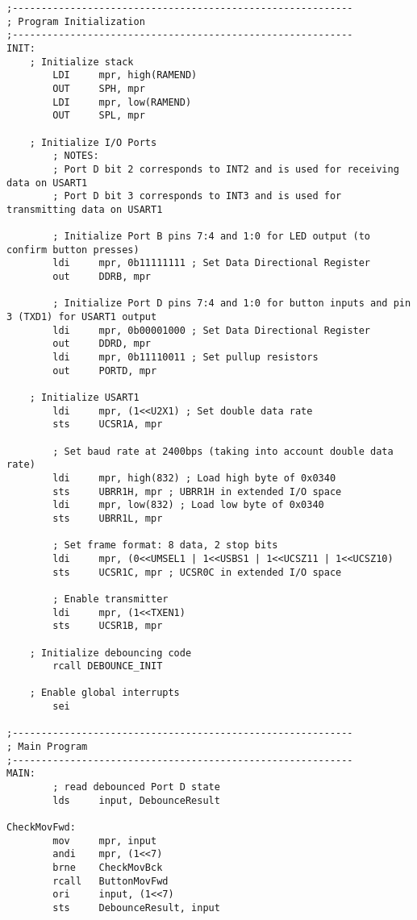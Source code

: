 \documentclass[12pt,letterpaper]{article}
\begin{document}
\begin{verbatim}
;-----------------------------------------------------------
; Program Initialization
;-----------------------------------------------------------
INIT:
    ; Initialize stack
        LDI     mpr, high(RAMEND)
        OUT     SPH, mpr
        LDI     mpr, low(RAMEND)
        OUT     SPL, mpr

    ; Initialize I/O Ports
        ; NOTES:
        ; Port D bit 2 corresponds to INT2 and is used for receiving data on USART1
        ; Port D bit 3 corresponds to INT3 and is used for transmitting data on USART1

        ; Initialize Port B pins 7:4 and 1:0 for LED output (to confirm button presses)
        ldi     mpr, 0b11111111 ; Set Data Directional Register
        out     DDRB, mpr

        ; Initialize Port D pins 7:4 and 1:0 for button inputs and pin 3 (TXD1) for USART1 output
        ldi     mpr, 0b00001000 ; Set Data Directional Register
        out     DDRD, mpr
        ldi     mpr, 0b11110011 ; Set pullup resistors
        out     PORTD, mpr

    ; Initialize USART1
        ldi     mpr, (1<<U2X1) ; Set double data rate
        sts     UCSR1A, mpr

        ; Set baud rate at 2400bps (taking into account double data rate)
        ldi     mpr, high(832) ; Load high byte of 0x0340
        sts     UBRR1H, mpr ; UBRR1H in extended I/O space
        ldi     mpr, low(832) ; Load low byte of 0x0340
        sts     UBRR1L, mpr

        ; Set frame format: 8 data, 2 stop bits
        ldi     mpr, (0<<UMSEL1 | 1<<USBS1 | 1<<UCSZ11 | 1<<UCSZ10)
        sts     UCSR1C, mpr ; UCSR0C in extended I/O space

        ; Enable transmitter
        ldi     mpr, (1<<TXEN1)
        sts     UCSR1B, mpr
        
    ; Initialize debouncing code
        rcall DEBOUNCE_INIT

    ; Enable global interrupts
        sei

;-----------------------------------------------------------
; Main Program
;-----------------------------------------------------------
MAIN:
        ; read debounced Port D state
        lds     input, DebounceResult

CheckMovFwd:
        mov     mpr, input
        andi    mpr, (1<<7)
        brne    CheckMovBck
        rcall   ButtonMovFwd
        ori     input, (1<<7)
        sts     DebounceResult, input


\end{verbatim}
\end{document}
